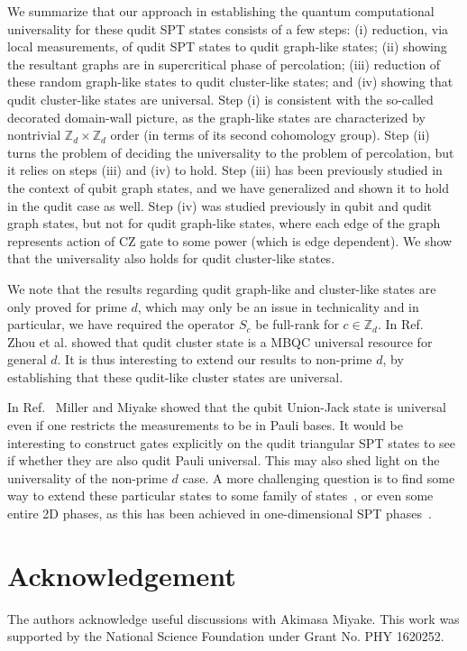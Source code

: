 \documentclass[aps,amsfonts,pra,twocolumn,showpacs]{revtex4-1}
\newcommand{\zd}{\mathbb{Z}_d}
\begin{document}
We summarize that our approach in establishing the quantum computational universality for these qudit SPT states consists of a few steps: (i) reduction, via local measurements, of qudit SPT states to qudit graph-like states; (ii) showing the resultant graphs are in supercritical phase of percolation; (iii) reduction of these random graph-like states to qudit cluster-like states; and (iv) showing that qudit cluster-like states are universal. Step (i) is consistent with the so-called decorated domain-wall picture, as the graph-like states are characterized by  nontrivial $\zd \times \zd$ order (in terms of its second cohomology group). Step (ii) turns the problem of deciding the universality to the problem of percolation, but it relies on steps (iii) and (iv) to hold. Step (iii) has been previously studied in the context of qubit graph states, and we have generalized and shown it to hold in the qudit case as well. Step  (iv) was studied previously in qubit and qudit graph states, but not for qudit graph-like states, where each edge of the graph represents action of CZ gate to some power (which is edge dependent). We show that the universality also holds for qudit cluster-like states. 

We note that the results regarding qudit graph-like and cluster-like states are only proved for prime $d$, which may only be  an issue in technicality and in particular, we have required the operator $S_c$ be full-rank for $c \in \zd$. In Ref.~\cite{Zhou2003} Zhou et al. showed that qudit cluster state is a MBQC universal resource for general $d$. It is thus interesting to extend our results to non-prime $d$, by establishing that these qudit-like cluster states are universal.

In Ref.~\cite{Miller2016}  Miller and Miyake showed that the qubit Union-Jack state is universal even if one restricts the measurements to be in Pauli bases. It would be interesting to construct gates explicitly on the qudit triangular SPT states to see if whether they are also qudit Pauli universal. This may also shed light on the universality of the non-prime $d$ case. A more challenging question is to find some way to  extend these particular states to some family of states~\cite{Miller2016_2},  or even some entire  2D phases, as  this has been achieved in one-dimensional SPT phases~\cite{Stephen17,Raussendorf17}.


\section*{Acknowledgement}
 The authors acknowledge useful discussions with Akimasa Miyake. This work was supported by the National Science Foundation under Grant No. PHY 1620252.
\end{document}
